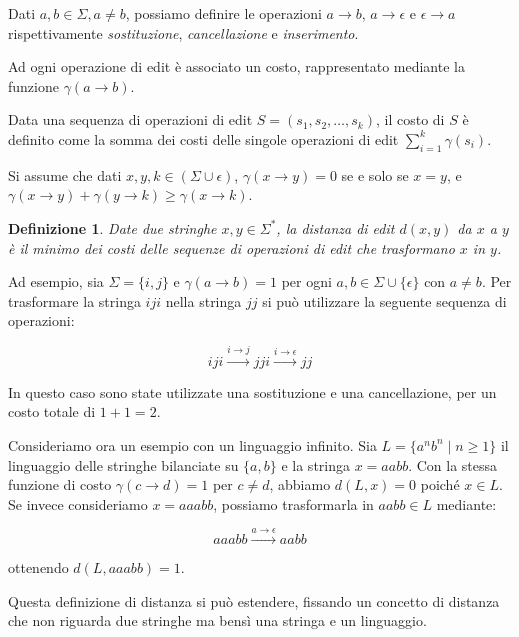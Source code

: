 \documentclass[a4paper,12pt]{report}
\newtheorem{definition}{Definizione}[chapter]
\theoremstyle{propositionstyle}
\begin{document}
    Dati $a, b \in \Sigma, a \neq b$, possiamo definire le operazioni $a \rightarrow b$, $a \rightarrow \epsilon$ e $\epsilon \rightarrow a$ rispettivamente
    \textit{sostituzione}, \textit{cancellazione} e \textit{inserimento}.
    
    Ad ogni operazione di edit è associato un costo, rappresentato mediante la funzione $\gamma(a \rightarrow b)$.
    
    Data una sequenza di operazioni di edit $S = \left(s_1, s_2, \dots, s_k\right)$, il costo di $S$ è definito come la somma dei costi delle singole operazioni di edit
    $\sum_{i=1}^{k} \gamma(s_i)$.

    Si assume che dati $x, y, k \in \left(\Sigma \cup \epsilon\right)$, $\gamma\left(x \rightarrow y\right) = 0$ se e solo se $x = y$, e $\gamma\left(x \rightarrow y\right)
    + \gamma\left(y \rightarrow k\right) \geq \gamma\left(x \rightarrow k\right)$.

    \begin{definition}
        Date due stringhe $x, y \in \Sigma^*$, la distanza di edit $d\left(x, y\right)$ da $x$ a $y$ è il minimo dei costi delle sequenze di operazioni di edit che trasformano $x$ in $y$.
    \end{definition}
    
    Ad esempio, sia $\Sigma = \{i, j\}$ e $\gamma\left(a \rightarrow b\right) = 1$ per ogni $a, b \in \Sigma \cup \{\epsilon\}$ con $a \neq b$. Per trasformare la stringa $iji$ nella stringa $jj$ si può utilizzare la seguente sequenza di operazioni:
    
    $$iji \xrightarrow{i \rightarrow j} jji \xrightarrow{i \rightarrow \epsilon} jj$$
    
    In questo caso sono state utilizzate una sostituzione e una cancellazione, per un costo totale di $1 + 1 = 2$.
    
    Consideriamo ora un esempio con un linguaggio infinito. Sia $L = \{a^n b^n \mid n \geq 1\}$ il linguaggio delle stringhe bilanciate su $\{a, b\}$ e la stringa $x = aabb$. Con la stessa funzione di costo $\gamma(c \rightarrow d) = 1$ per $c \neq d$, abbiamo $d(L, x) = 0$ poiché $x \in L$. Se invece consideriamo $x = aaabb$, possiamo trasformarla in $aabb \in L$ mediante:
    
    $$aaabb \xrightarrow{a \rightarrow \epsilon} aabb$$
    
    ottenendo $d(L, aaabb) = 1$.

    Questa definizione di distanza si può estendere, fissando un concetto di distanza che non riguarda due stringhe ma bensì una stringa e un linguaggio.
\end{document}
